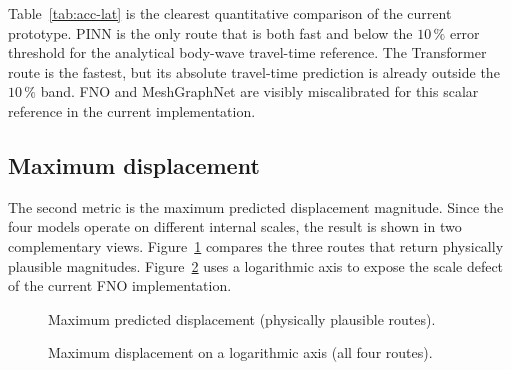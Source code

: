 Table~\ref{tab:acc-lat} is the clearest quantitative comparison of the
current prototype. PINN is the only route that is both fast and below
the $10\,\%$ error threshold for the analytical body-wave travel-time
reference. The Transformer route is the fastest, but its absolute
travel-time prediction is already outside the $10\,\%$ band. FNO and
MeshGraphNet are visibly miscalibrated for this scalar reference in the
current implementation.

\subsection{Maximum displacement}

The second metric is the maximum predicted displacement magnitude. Since
the four models operate on different internal scales, the result is
shown in two complementary views. Figure~\ref{fig:displacement-valid}
compares the three routes that return physically plausible magnitudes.
Figure~\ref{fig:displacement-log} uses a logarithmic axis to expose the
scale defect of the current FNO implementation.

\begin{figure}[ht]
\centering
{}
\caption{Maximum predicted displacement (physically plausible routes).}
\label{fig:displacement-valid}
\end{figure}

\begin{figure}[ht]
\centering
{}
\caption{Maximum displacement on a logarithmic axis (all four routes).}
\label{fig:displacement-log}
\end{figure}

